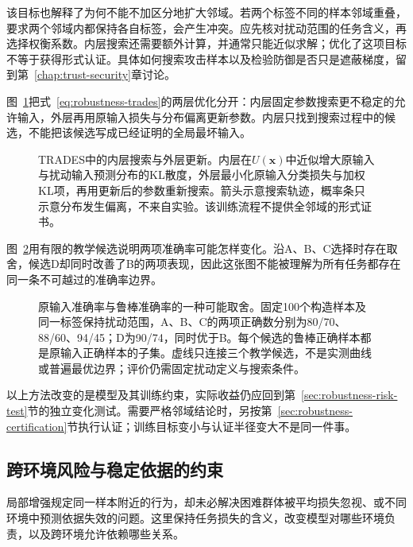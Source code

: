 该目标也解释了为何不能不加区分地扩大邻域。若两个标签不同的样本邻域重叠，要求两个邻域内都保持各自标签，会产生冲突。应先核对扰动范围的任务含义，再选择权衡系数。内层搜索还需要额外计算，并通常只能近似求解；优化了这项目标不等于获得形式认证。具体如何搜索攻击样本以及检验防御是否只是遮蔽梯度，留到第~\ref{chap:trust-security}章讨论。

图~\ref{fig:trust-adversarial-training-loops}把式~\eqref{eq:robustness-trades}的两层优化分开：内层固定参数搜索更不稳定的允许输入，外层再用原输入损失与分布偏离更新参数。内层只找到搜索过程中的候选，不能把该候选写成已经证明的全局最坏输入。

\begin{figure}[htbp]
  \centering
  
  \caption{TRADES中的内层搜索与外层更新。内层在$U(\bm x)$中近似增大原输入与扰动输入预测分布的KL散度，外层最小化原输入分类损失与加权KL项，再用更新后的参数重新搜索。箭头示意搜索轨迹，概率条只示意分布发生偏离，不来自实验。该训练流程不提供全邻域的形式证书。}
  \label{fig:trust-adversarial-training-loops}
\end{figure}

图~\ref{fig:trust-robust-accuracy-tradeoff}用有限的教学候选说明两项准确率可能怎样变化。沿A、B、C选择时存在取舍，候选D却同时改善了B的两项表现，因此这张图不能被理解为所有任务都存在同一条不可越过的准确率边界。

\begin{figure}[htbp]
  \centering
  
  \caption{原输入准确率与鲁棒准确率的一种可能取舍。固定100个构造样本及同一标签保持扰动范围，A、B、C的两项正确数分别为80/70、88/60、94/45；D为90/74，同时优于B。每个候选的鲁棒正确样本都是原输入正确样本的子集。虚线只连接三个教学候选，不是实测曲线或普遍最优边界；评价仍需固定扰动定义与搜索条件。}
  \label{fig:trust-robust-accuracy-tradeoff}
\end{figure}

以上方法改变的是模型及其训练约束，实际收益仍应回到第~\ref{sec:robustness-risk-test}节的独立变化测试。需要严格邻域结论时，另按第~\ref{sec:robustness-certification}节执行认证；训练目标变小与认证半径变大不是同一件事。

\subsection{跨环境风险与稳定依据的约束}
\label{sec:robustness-environment-enhancement}

局部增强规定同一样本附近的行为，却未必解决困难群体被平均损失忽视、或不同环境中预测依据失效的问题。这里保持任务损失的含义，改变模型对哪些环境负责，以及跨环境允许依赖哪些关系。

